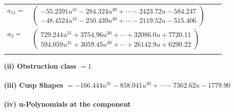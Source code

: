 \documentclass[1p]{elsarticle_modified}
\theoremstyle{definition}
\begin{document}
\begin{tabular}{m{7pt} m{180pt} m{7pt} m{180pt} }
\flushright $a_{11}=$&$\begin{pmatrix}-55.2391 u^{31}-284.324 u^{30}+\cdots-2423.72 u-584.247\\-48.4524 u^{31}-250.439 u^{30}+\cdots-2119.52 u-515.406\end{pmatrix}$ \\
\flushright $a_{3}=$&$\begin{pmatrix}729.244 u^{31}+3754.96 u^{30}+\cdots+32086.0 u+7720.11\\594.059 u^{31}+3059.45 u^{30}+\cdots+26142.9 u+6290.22\end{pmatrix}$\\&\end{tabular}
\flushleft \textbf{(ii) Obstruction class $= 1$}\\~\\
\flushleft \textbf{(iii) Cusp Shapes $= -166.444 u^{31}-858.041 u^{30}+\cdots-7362.62 u-1779.90$}\\~\\
\newpage\renewcommand{\arraystretch}{1}
\flushleft \textbf{(iv) u-Polynomials at the component}\newline \\
\end{document}
